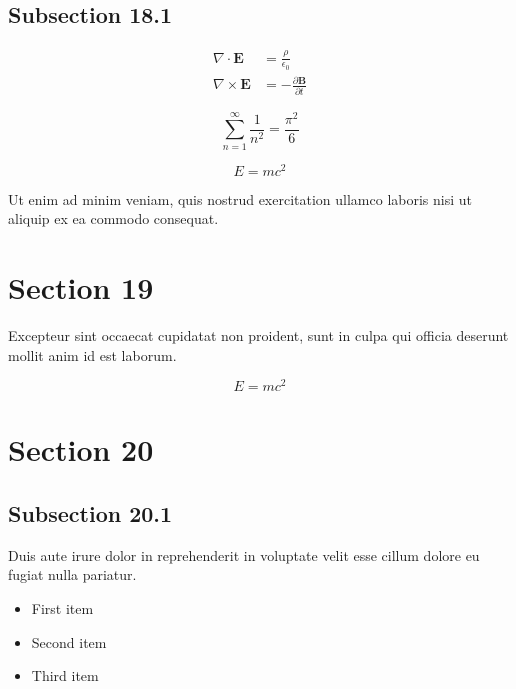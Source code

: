 \documentclass{article}
\begin{document}
\subsection{Subsection 18.1}

\begin{align}
    \nabla \cdot \mathbf{E} &= \frac{\rho}{\epsilon_0} \\
    \nabla \times \mathbf{E} &= -\frac{\partial \mathbf{B}}{\partial t}
\end{align}

\begin{equation}
    \sum_{n=1}^{\infty} \frac{1}{n^2} = \frac{\pi^2}{6}
\end{equation}

\begin{equation}
    E = mc^2
\end{equation}


Ut enim ad minim veniam, quis nostrud exercitation ullamco laboris nisi ut aliquip ex ea commodo consequat.


\section{Section 19}


Excepteur sint occaecat cupidatat non proident, sunt in culpa qui officia deserunt mollit anim id est laborum.

\begin{equation}
    E = mc^2
\end{equation}

\section{Section 20}

\subsection{Subsection 20.1}

Duis aute irure dolor in reprehenderit in voluptate velit esse cillum dolore eu fugiat nulla pariatur.

\begin{itemize}
\item First item
\item Second item
\item Third item
\end{itemize}
\end{document}
